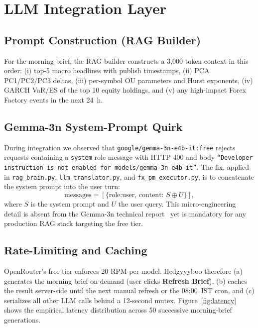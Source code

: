 \documentclass[conference]{IEEEtran}
\begin{document}
\section{LLM Integration Layer}
\label{sec:llm}

\subsection{Prompt Construction (RAG Builder)}
For the morning brief, the RAG builder constructs a 3,000-token context in this order: (i) top-5 macro headlines with publish timestamps, (ii) PCA PC1/PC2/PC3 deltas, (iii) per-symbol OU parameters and Hurst exponents, (iv) GARCH VaR/ES of the top 10 equity holdings, and (v) any high-impact Forex Factory events in the next 24~h.

\subsection{Gemma-3n System-Prompt Quirk}
During integration we observed that \texttt{google/gemma-3n-e4b-it:free} rejects requests containing a \texttt{system} role message with HTTP 400 and body \texttt{``Developer instruction is not enabled for models/gemma-3n-e4b-it''}. The fix, applied in \texttt{rag\_brain.py}, \texttt{llm\_translator.py}, and \texttt{fx\_pm\_executor.py}, is to concatenate the system prompt into the user turn:
\begin{equation*}
\text{messages} = [\{\text{role:user, content: } S \oplus U\}],
\end{equation*}
where $S$ is the system prompt and $U$ the user query. This micro-engineering detail is absent from the Gemma-3n technical report~\cite{gemma2024technical} yet is mandatory for any production RAG stack targeting the free tier.

\subsection{Rate-Limiting and Caching}
\label{sec:ratelimit}
OpenRouter's free tier enforces 20 RPM per model. Hedgyyyboo therefore (a) generates the morning brief on-demand (user clicks \textbf{Refresh Brief}), (b) caches the result server-side until the next manual refresh or the 08:00~IST cron, and (c) serializes all other LLM calls behind a 12-second mutex. Figure~\ref{fig:latency} shows the empirical latency distribution across 50 successive morning-brief generations.
\end{document}
